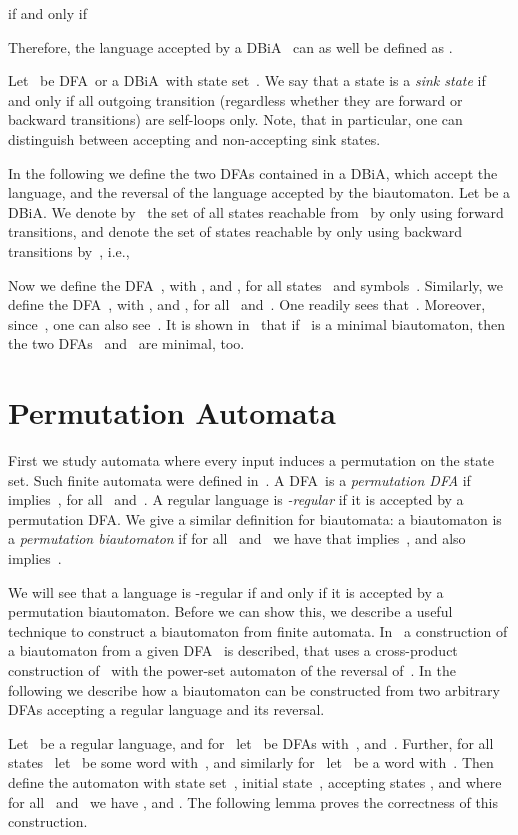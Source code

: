 \documentclass[submission]{eptcs}
\newcommand{\dfa}{\textrm{DFA}}
\newcommand{\dbia}{\textrm{DBiA}}
\begin{document}
if and only if

Therefore, the language accepted by a \dbia~ can as well be defined
as .

Let~ be \dfa\ or a \dbia\ with state set~. We say that a state
 is a \emph{sink state} if and only if all outgoing transition
(regardless whether they are forward or backward transitions) are
self-loops only. Note, that in particular, one can distinguish between
accepting and non-accepting sink states.

In the following we define the two \dfa s contained in a \dbia, which
accept the language, and the reversal of the language accepted by the
biautomaton.
Let  be a \dbia.  We denote
by~ the set of all states reachable from~ by only using
forward transitions, and denote the set of states reachable by only
using backward transitions by~, i.e.,

Now we define the \dfa\ , with , and , for all states~ and symbols~.  Similarly, we define the \dfa\
, with , and , for all~
and~.
One readily sees that~.  Moreover, since~, one can also see~.
It is shown in~\cite{HoJa14} that if~ is a minimal biautomaton,
then the two \dfa s~ and~ are minimal, too.


\section{Permutation Automata}
\label{sec:permutation-automata}

First we study automata where every input induces a permutation on the
state set.  Such finite automata were defined in~\cite{Th68a}.  A
\dfa\  is a \emph{permutation \dfa} if
 implies~, for all~
and~.  A regular language is \emph{-regular} if it is
accepted by a permutation \dfa.
We give a similar definition for biautomata: a biautomaton
 is a \emph{permutation biautomaton}
if for all~ and~ we have that  implies~, and also  implies~.

We will see that a language is -regular if and only if it is
accepted by a permutation biautomaton.  Before we can show this, we
describe a useful technique to construct a biautomaton from finite
automata.
In~\cite{KlPo12} a construction of a biautomaton from a given \dfa~
is described, that uses a cross-product construction of~ with the
power-set automaton of the reversal of~.
In the following we describe how a biautomaton can be constructed from
two arbitrary \dfa s accepting a regular language and its reversal.

Let~ be a regular language, and for~
let~ be \dfa s
with~, and~.  Further, for all states~
let~ be some word with~, and
similarly for~ let~ be a word
with~.
Then define the automaton  with state set~,
initial state~, accepting states
, and where for
all~ and~ we have , and .  The following lemma proves the correctness
of this construction.
\end{document}
